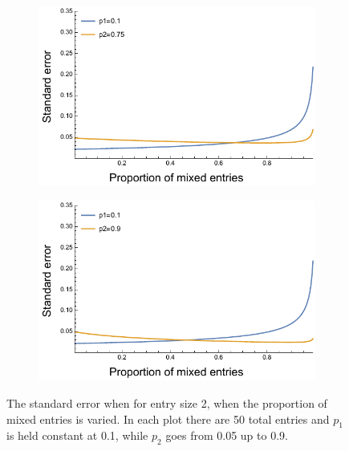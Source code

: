 \documentclass[useAMS,usenatbib,referee]{biom}
\begin{document}
\begin{figure}[h]
\begin{subfigure}[b]{0.49\textwidth}
\end{subfigure}
\hfill
\begin{subfigure}[b]{0.49\textwidth}
\includegraphics[width=\textwidth]{SE_twotype_p1_01_p2_075.pdf}
\end{subfigure}
\begin{subfigure}[b]{0.49\textwidth}
\includegraphics[width=\textwidth]{SE_twotype_p1_01_p2_09.pdf}
\end{subfigure}

\caption{The standard error when for entry size 2, when the proportion of mixed entries is varied. In each plot there are 50 total entries and \(p_1\) is held constant at 0.1, while \(p_2\) goes from 0.05 up to 0.9.}
\label{fig:two_type_se_fourplot}
\end{figure}
\end{document}
